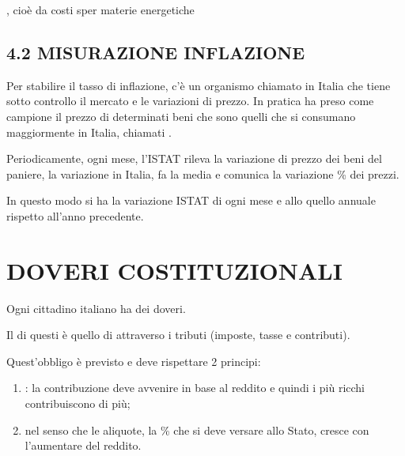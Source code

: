 \documentclass[letterpaper,10pt,italian]{sphinxmanual}
\begin{document}
\sphinxAtStartPar
{}
, cioè da costi sper materie energetiche


\section{4.2 \sphinxhyphen{} MISURAZIONE INFLAZIONE}
\label{\detokenize{4.L'INFLAZIONE:misurazione-inflazione}}
\sphinxAtStartPar
Per stabilire il tasso di inflazione, c’è un organismo chiamato  in Italia che tiene sotto
controllo il mercato e le variazioni di prezzo.
In pratica ha preso come campione il prezzo di determinati beni che sono quelli che si consumano maggiormente
in Italia, chiamati .

\begin{figure}[htbp]
\centering

\noindent{}
\end{figure}

\sphinxAtStartPar
Periodicamente, ogni mese, l’ISTAT rileva la variazione di prezzo dei beni del paniere,
la variazione in Italia, fa la media e comunica la variazione \% dei prezzi.

\sphinxAtStartPar
In questo modo si ha la variazione ISTAT di ogni mese e allo quello annuale rispetto all’anno precedente.

\sphinxstepscope


\chapter{DOVERI COSTITUZIONALI}
\label{\detokenize{Doveri Costituzionali:doveri-costituzionali}}\label{\detokenize{Doveri Costituzionali::doc}}
\begin{figure}[htbp]
\centering

\noindent{}
\end{figure}

\sphinxAtStartPar
Ogni cittadino italiano ha dei doveri.

\sphinxAtStartPar
Il  di questi è quello di 
attraverso i tributi (imposte, tasse e contributi).

\sphinxAtStartPar
Quest’obbligo è previsto  e deve rispettare 2 principi:
\begin{enumerate}
%
\item {} 
\sphinxAtStartPar
{}: la contribuzione deve avvenire in base al reddito e quindi i più ricchi contribuiscono di più;

\item {} 
\sphinxAtStartPar
{} nel senso che le aliquote, la \% che si deve versare allo Stato, cresce con l’aumentare del reddito.

\end{enumerate}
\end{document}
